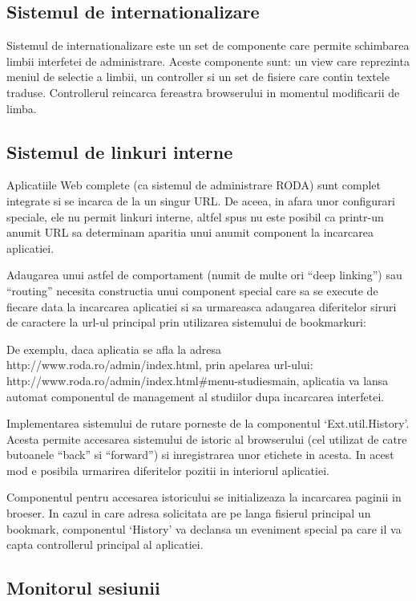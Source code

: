 \subsection{Sistemul de internationalizare}

Sistemul de internationalizare este un set de componente care permite schimbarea limbii interfetei de administrare. Aceste componente sunt: un view care reprezinta meniul de selectie a limbii, un controller si un set de fisiere care contin textele traduse. Controllerul reincarca fereastra browserului in momentul modificarii de limba. 

\subsection{Sistemul de linkuri interne}

Aplicatiile Web complete (ca sistemul de administrare RODA) sunt complet integrate si se incarca de la un singur URL. De aceea, in afara unor configurari speciale, ele nu permit linkuri interne, altfel spus nu este posibil ca printr-un anumit URL sa determinam aparitia unui anumit component la incarcarea aplicatiei. 

Adaugarea unui astfel de comportament (numit de multe ori “deep linking”) sau “routing” necesita constructia unui component special care sa se execute de fiecare data la incarcarea aplicatiei si sa urmareasca adaugarea diferitelor siruri de caractere la url-ul principal prin utilizarea sistemului de bookmarkuri: 

De exemplu, daca aplicatia se afla la adresa http://www.roda.ro/admin/index.html, prin apelarea url-ului: http://www.roda.ro/admin/index.html\#menu-studiesmain, aplicatia va lansa automat componentul de management al studiilor dupa incarcarea interfetei. 

Implementarea sistemului de rutare porneste de la componentul ‘Ext.util.History’. Acesta permite accesarea sistemului de istoric al browserului (cel utilizat de catre butoanele “back” si “forward”) si inregistrarea unor etichete in acesta. In acest mod e posibila urmarirea diferitelor pozitii in interiorul aplicatiei. 

Componentul pentru accesarea istoricului se initializeaza la incarcarea paginii in broeser. In cazul in care adresa solicitata are pe langa fisierul principal un bookmark, componentul ‘History’ va declansa un eveniment special pa care il va capta controllerul principal al aplicatiei. 


\subsection{Monitorul sesiunii}

